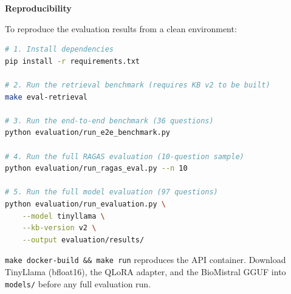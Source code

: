 \vspace{0.5cm}
\noindent\textbf{Reproducibility}

To reproduce the evaluation results from a clean environment:

\begin{lstlisting}[language=bash]
# 1. Install dependencies
pip install -r requirements.txt

# 2. Run the retrieval benchmark (requires KB v2 to be built)
make eval-retrieval

# 3. Run the end-to-end benchmark (36 questions)
python evaluation/run_e2e_benchmark.py

# 4. Run the full RAGAS evaluation (10-question sample)
python evaluation/run_ragas_eval.py --n 10

# 5. Run the full model evaluation (97 questions)
python evaluation/run_evaluation.py \
    --model tinyllama \
    --kb-version v2 \
    --output evaluation/results/
\end{lstlisting}

\texttt{make docker-build\allowbreak{} \&\& make run} reproduces the API container. Download TinyLlama (bfloat16), the QLoRA adapter, and the BioMistral GGUF into \texttt{models/} before any full evaluation run.
